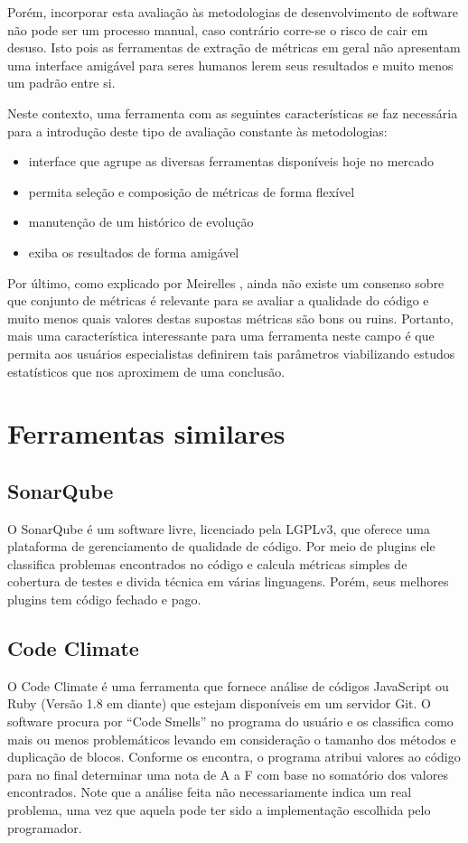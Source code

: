 \documentclass[12pt]{article}
\begin{document}
Porém, incorporar esta avaliação às metodologias de desenvolvimento de software não pode ser um processo manual, caso contrário corre-se o risco de cair em desuso. Isto pois as ferramentas de extração de métricas em geral não apresentam uma interface amigável para seres humanos lerem seus resultados e muito menos um padrão entre si.

Neste contexto, uma ferramenta com as seguintes características se faz necessária para a introdução deste tipo de avaliação constante às metodologias:
\begin{itemize}
  \item interface que agrupe as diversas ferramentas disponíveis hoje no mercado
  \item permita seleção e composição de métricas de forma flexível
  \item manutenção de um histórico de evolução
  \item exiba os resultados de forma amigável
\end{itemize}

Por último, como explicado por Meirelles \cite{m13}, ainda não existe um consenso sobre que conjunto de métricas é relevante para se avaliar a qualidade do código e muito menos quais valores destas supostas métricas são bons ou ruins. Portanto, mais uma característica interessante para uma ferramenta neste campo é que permita aos usuários especialistas definirem tais parâmetros viabilizando estudos estatísticos que nos aproximem de uma conclusão.

\section{Ferramentas similares}

  \subsection{SonarQube}
  O SonarQube é um software livre, licenciado pela LGPLv3, que oferece uma plataforma de gerenciamento de qualidade de código. Por meio de plugins ele classifica problemas encontrados no código e calcula métricas simples de cobertura de testes e divida técnica em várias linguagens. Porém, seus melhores plugins tem código fechado e pago.

  \subsection{Code Climate}
  O Code Climate é uma ferramenta que fornece análise de códigos JavaScript ou Ruby (Versão 1.8 em diante) que estejam disponíveis em um servidor Git.
  O software procura por ``Code Smells'' no programa do usuário e os classifica como mais ou menos problemáticos levando em consideração o tamanho dos métodos e duplicação de blocos. Conforme os encontra, o programa atribui valores ao código para no final determinar uma nota de A a F com base no somatório dos valores encontrados. Note que a análise feita não necessariamente indica um real problema, uma vez que aquela pode ter sido a implementação escolhida pelo programador.
\end{document}
